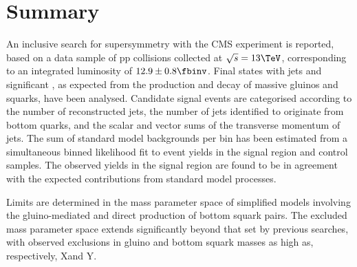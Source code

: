 \section{Summary}
\label{sec:summary}

An inclusive search for supersymmetry with the CMS experiment is
reported, based on a data sample of pp collisions collected at
$\sqrt{s} = 13\TeV$, corresponding to an integrated luminosity of $12.9
\pm 0.8 \fbinv$. Final states with jets and significant \ptvecmiss, as
expected from the production and decay of massive gluinos and squarks,
have been analysed. Candidate signal events are categorised according
to the number of reconstructed jets, the number of jets identified to
originate from bottom quarks, and the scalar and vector sums of the
transverse momentum of jets. The sum of standard model backgrounds per
bin has been estimated from a simultaneous binned likelihood fit to
event yields in the signal region and control samples. The observed
yields in the signal region are found to be in agreement with the
expected contributions from standard model processes. 

Limits are determined in the mass parameter space of simplified models
involving the gluino-mediated and direct production of bottom squark
pairs. The excluded mass parameter space extends significantly beyond
that set by previous searches, with observed exclusions in gluino and
bottom squark masses as high as, respectively, X\gev and Y\gev.

